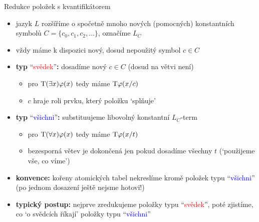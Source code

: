 \documentclass{beamer}
\begin{document}
\begin{frame}{Redukce položek s kvantifikátorem}

    \pause
    \begin{itemize}
        \item jazyk $L$ rozšíříme o spočetně mnoho \alert{nových (pomocných) konstantních symbolů} $C=\{c_0,c_1,c_2,\dots\}$, 
        označíme \alert{$L_C$}\pause
        \item vždy máme k dispozici \alert{nový}, dosud \alert{nepoužitý} symbol $c\in C$\pause
        
        \medskip

        \item \textbf{typ} ``\textcolor{red}{svědek}''\textbf{:} dosadíme \alert{nový} $c\in C$ (dosud na větvi není)\pause
        \begin{itemize}
            \item pro $\mathrm{T}(\exists x)\varphi(x)$ tedy máme $\mathrm{T}\varphi(x/c)$\pause
            \item $c$ hraje roli prvku, který položku `splňuje'\pause
        \end{itemize}

        \medskip

        \item \textbf{typ} ``\textcolor{blue}{všichni}''\textbf{:} substituujeme \alert{libovolný} konstantní $L_C$-term\pause
        \begin{itemize}
            \item pro $\mathrm{T}(\forall x)\varphi(x)$ tedy máme $\mathrm{T}\varphi(x/t)$\pause
            \item bezesporná větev je \alert{dokončená} jen pokud \alert{dosadíme všechny $t$} (`použijeme vše, co víme')\pause
        \end{itemize}

        \medskip

        \item \textbf{konvence:} kořeny atomických tabel nekreslíme \alert{kromě položek typu} ``\textcolor{blue}{všichni}'' (po jednom dosazení ještě nejsme hotovi!)\pause
        
        \medskip
        
        \item \textbf{typický postup:} nejprve zredukujeme položky typu ``\textcolor{red}{svědek}'', poté zjistíme, co `\alert{o svědcích říkají}' položky typu ``\textcolor{blue}{všichni}'' 
        
    \end{itemize}

\end{frame}
\end{document}
